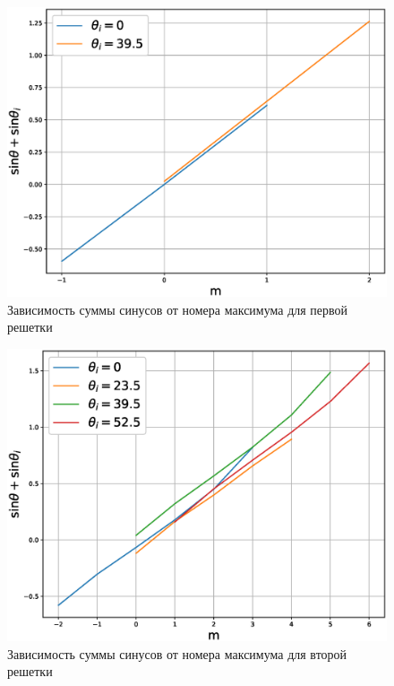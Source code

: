 \documentclass[a4paper,14pt]{extarticle}
\begin{document}
				\begin{figure}[h!]
					\centering
					\includegraphics[width=1\linewidth]{Fraun1.eps}
					\caption{Зависимость суммы синусов от номера максимума для первой решетки}
					\label{fig3}
				\end{figure}
				
				\newpage
				
				\begin{figure}[h!]
					\centering
					\includegraphics[width=1\linewidth]{Fraun2.eps}
					\caption{Зависимость суммы синусов от номера максимума для второй решетки}
					\label{fig4}
				\end{figure}
				
\end{document}
